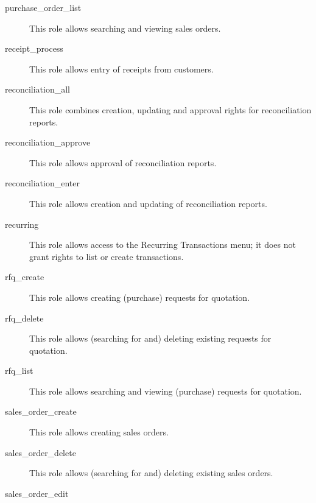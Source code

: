 \begin{description}
\item [purchase\_order\_list] \htmlspacing 
                         This role allows searching and viewing sales orders.
\item [receipt\_process] \htmlspacing 
                         This role allows entry of receipts from customers.
\item [reconciliation\_all] \htmlspacing 
                         This role combines creation, updating and approval rights for reconciliation reports.
\item [reconciliation\_approve] \htmlspacing 
                         This role allows approval of reconciliation reports.
\item [reconciliation\_enter] \htmlspacing 
                         This role allows creation and updating of reconciliation reports.
\item [recurring] \htmlspacing 
                         This role allows access to the Recurring Transactions
                         menu; it does not grant rights to list or create
                         transactions.
\item [rfq\_create] \htmlspacing 
                         This role allows creating (purchase) requests for quotation.
\item [rfq\_delete] \htmlspacing 
                         This role allows (searching for and) deleting existing requests for quotation.
\item [rfq\_list] \htmlspacing 
                         This role allows searching and viewing (purchase) requests for quotation.
\item [sales\_order\_create] \htmlspacing 
                         This role allows creating sales orders.
\item [sales\_order\_delete] \htmlspacing 
                         This role allows (searching for and) deleting existing sales orders.
\item [sales\_order\_edit] \htmlspacing 

\end{description}
